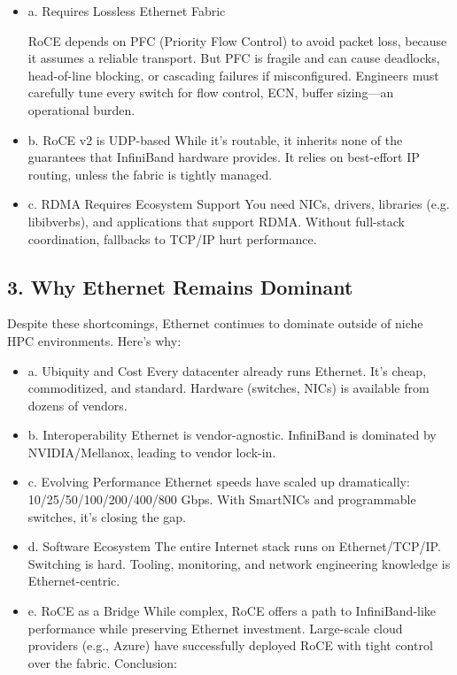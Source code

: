 \documentclass[../../../OAE-SPEC-MAIN.tex]{subfiles}
\begin{document}
\begin{itemize}
\item a. Requires Lossless Ethernet Fabric

RoCE depends on PFC (Priority Flow Control) to avoid packet loss, because it assumes a reliable transport.
But PFC is fragile and can cause deadlocks, head-of-line blocking, or cascading failures if misconfigured.
Engineers must carefully tune every switch for flow control, ECN, buffer sizing—an operational burden.

\item b. RoCE v2 is UDP-based
While it’s routable, it inherits none of the guarantees that InfiniBand hardware provides.
It relies on best-effort IP routing, unless the fabric is tightly managed.

\item c. RDMA Requires Ecosystem Support
You need NICs, drivers, libraries (e.g. libibverbs), and applications that support RDMA.
Without full-stack coordination, fallbacks to TCP/IP hurt performance.

\end{itemize}

\subsection{3. Why Ethernet Remains Dominant}

Despite these shortcomings, Ethernet continues to dominate outside of niche HPC environments. Here’s why:

\begin{itemize}
\item a. Ubiquity and Cost
Every datacenter already runs Ethernet. It’s cheap, commoditized, and standard.
Hardware (switches, NICs) is available from dozens of vendors.

\item b. Interoperability
Ethernet is vendor-agnostic. InfiniBand is dominated by NVIDIA/Mellanox, leading to vendor lock-in.

\item c. Evolving Performance
Ethernet speeds have scaled up dramatically: 10/25/50/100/200/400/800 Gbps.
With SmartNICs and programmable switches, it’s closing the gap.

\item d. Software Ecosystem
The entire Internet stack runs on Ethernet/TCP/IP. Switching is hard.
Tooling, monitoring, and network engineering knowledge is Ethernet-centric.

\item e. RoCE as a Bridge
While complex, RoCE offers a path to InfiniBand-like performance while preserving Ethernet investment.
Large-scale cloud providers (e.g., Azure) have successfully deployed RoCE with tight control over the fabric.
Conclusion:

\end{itemize}
\end{document}
